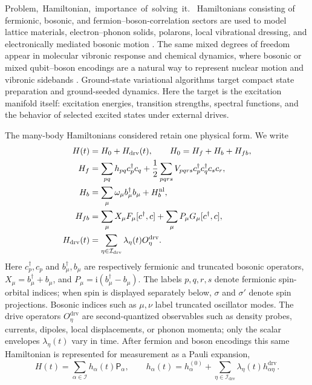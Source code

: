 \documentclass[
  reprint,
  amsmath,
  amssymb,
  aps,
  pra,
  nofootinbib,
  superscriptaddress,
  floatfix
]{revtex4-2}
\newcommand{\tentative}[1]{\textcolor{red!70!black}{#1}}
\newcommand{\structlabel}[1]{\noindent\mbox{\tentative{#1.}}~}
\newcommand{\ii}{\mathrm{i}}
\newcommand{\drv}{\mathrm{drv}}
\begin{document}
\structlabel{Problem, Hamiltonian, importance of solving it}
Hamiltonians consisting of fermionic, bosonic, and fermion--boson-correlation sectors are used to model lattice materials, electron--phonon solids, polarons, local vibrational dressing, and electronically mediated bosonic motion \cite{Hubbard1963,Holstein1959,Giustino2017ElectronPhonon,FehskeTrugman2007HolsteinPolaron,Macridin2018ElectronPhonon,Li2023VBSElectronPhonon,Backes2023HHDMFT,Denner2023HybridEP,Peng2025BosonHamiltonians}.  The same mixed degrees of freedom appear in molecular vibronic response and chemical dynamics, where bosonic or mixed qubit--boson encodings are a natural way to represent nuclear motion and vibronic sidebands \cite{SawayaHuh2019VibronicSpectra,Sawaya2020DLevel,MacDonell2023VibronicAnalog,Dutta2024BosonicChemistry,Navickas2025ChemicalDynamics}.  Ground-state variational algorithms target compact state preparation and ground-seeded dynamics.  Here the target is the excitation manifold itself: excitation energies, transition strengths, spectral functions, and the behavior of selected excited states under external drives.

The many-body Hamiltonians considered retain one physical form.  We write
\begin{align}
H(t)&=H_0+H_{\drv}(t),
\qquad
H_0=H_f+H_b+H_{fb},
\nonumber\\
H_f&=\sum_{pq}h_{pq}c_p^\dagger c_q
+\frac12\sum_{pqrs}V_{pqrs}c_p^\dagger c_q^\dagger c_s c_r,
\nonumber\\
H_b&=\sum_{\mu}\omega_\mu b_\mu^\dagger b_\mu+H_b^{\rm nl},
\nonumber\\
H_{fb}&=\sum_{\mu}X_\mu F_\mu[c^\dagger,c]
+\sum_{\mu}P_\mu G_\mu[c^\dagger,c],
\nonumber\\
H_{\drv}(t)&=\sum_{\eta\in\mathcal I_{\drv}}\lambda_\eta(t)O_\eta^{\drv}.
\label{eq:general_fb_terms}
\end{align}
Here $c_p^\dagger,c_p$ and $b_\mu^\dagger,b_\mu$ are respectively fermionic and truncated bosonic operators, $X_\mu=b_\mu^\dagger+b_\mu$, and $P_\mu=\ii(b_\mu^\dagger-b_\mu)$.  The labels $p,q,r,s$ denote fermionic spin-orbital indices; when spin is displayed separately below, $\sigma$ and $\sigma'$ denote spin projections.  Bosonic indices such as $\mu,\nu$ label truncated oscillator modes.  The drive operators $O_\eta^{\drv}$ are second-quantized observables such as density probes, currents, dipoles, local displacements, or phonon momenta; only the scalar envelopes $\lambda_\eta(t)$ vary in time.  After fermion and boson encodings this same Hamiltonian is represented for measurement as a Pauli expansion,
\begin{equation}
H(t)=\sum_{\alpha\in\mathcal I}h_\alpha(t)\mathsf P_\alpha,
\qquad
h_\alpha(t)=h_\alpha^{(0)}
+\sum_{\eta\in\mathcal I_{\drv}}\lambda_\eta(t)h_{\alpha\eta}^{\drv}.
\label{eq:pauli_hamiltonian_intro}
\end{equation}
\end{document}
